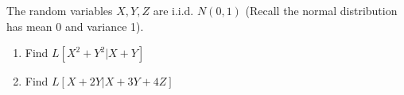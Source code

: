 
The random variables $X, Y, Z$ are i.i.d. $N (0, 1)$ 
(Recall the normal distribution has mean 0 and variance 1).
\begin{enumerate}
\item Find $L[X^2 + Y^2 |X + Y ]$

\vspace{9cm}

\item Find $L[X + 2Y |X + 3Y + 4Z]$


\end{enumerate}